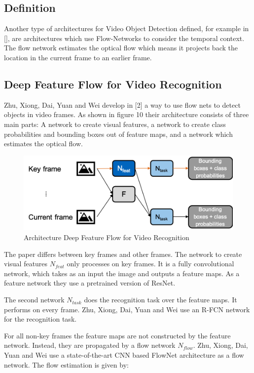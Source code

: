 \documentclass[conference]{IEEEtran}
\begin{document}
\subsection{Definition}
Another type  of architectures for Video Object Detection defined, for example in [], are architectures which use Flow-Networks to consider the temporal context. The flow network estimates the optical flow which means it projects back the location in the current frame to an earlier frame. 

\subsection{Deep Feature Flow for Video Recognition}
Zhu, Xiong, Dai, Yuan and Wei develop in [2] a way to use flow nets to detect objects in video frames. As shown in figure 10 their architecture consists of three main parts: A network to create visual features, a network to create class probabilities and bounding boxes out of feature maps, and a network which estimates the optical flow. \newline

\begin{figure} [h]
\includegraphics[width=\columnwidth]{Flow}
\caption{Architecture Deep Feature Flow for Video Recognition}
\end{figure}

The paper differs between key frames and other frames. The network to create visual features $ N_{feat} $ only processes on key frames. It is a fully convolutional network, which takes as an input the image and outputs a feature maps. As a feature network they use a pretrained version of ResNet. \newline

The second network $ N_{task} $ does the recognition task over the feature maps. It performs on every frame.  Zhu, Xiong, Dai, Yuan and Wei use an R-FCN network for the recognition task.  \newline

For all non-key frames the feature maps are not constructed by the feature network. Instead, they are propagated by a flow network $ N_{flow} $.  Zhu, Xiong, Dai, Yuan and Wei use a state-of-the-art CNN based FlowNet architecture as a flow network. The flow estimation is given by: \newline
\end{document}
